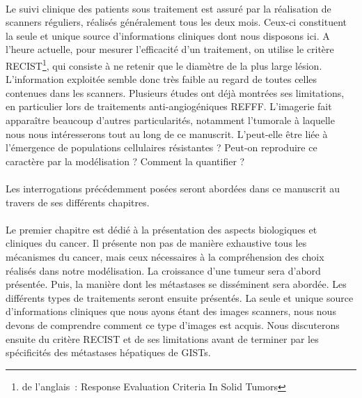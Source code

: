 \documentclass[main.tex]{subfiles}
\begin{document}
\paragraph{}
Le suivi clinique des patients sous traitement est assuré par la réalisation de scanners réguliers, réalisés généralement tous les deux mois. Ceux-ci constituent la seule et unique source d'informations cliniques dont nous disposons ici.  
A l'heure actuelle, pour mesurer l'efficacité d'un traitement, on %
utilise le critère RECIST\footnote{de l'anglais~: Response Evaluation Criteria In Solid Tumors}, qui consiste à ne retenir %
que le diamètre de la plus large lésion. 
L'information exploitée %
semble donc très faible au regard de toutes celles contenues dans les scanners. 
Plusieurs études ont déjà montrées ses limitations, en particulier lors de traitements anti-angiogéniques REFFF. L'imagerie fait apparaître beaucoup d'autres particularités, notamment l'\hetero tumorale à laquelle nous nous intéresserons tout au long de ce manuscrit. L'\hetero peut-elle être liée à l'émergence de populations cellulaires résistantes ? Peut-on reproduire ce caractère par la modélisation ? Comment la quantifier ?



\paragraph{}
Les interrogations précédemment posées seront abordées dans ce manuscrit au travers de ses différents chapitres. 

\paragraph{}
Le premier chapitre est dédié à la présentation des aspects biologiques et cliniques du cancer.  
Il présente non pas de manière exhaustive tous les mécanismes du cancer, mais ceux nécessaires à la compréhension des choix réalisés dans notre modélisation. 
La croissance d'une tumeur sera d'abord présentée. 
Puis, la manière dont les métastases se disséminent sera abordée. Les différents types de traitements seront ensuite présentés. La seule et unique source d'informations cliniques que nous ayons étant des images scanners, nous nous devons de comprendre comment ce type d'images est acquis. Nous discuterons ensuite du critère RECIST et de ses limitations avant de terminer par les spécificités des métastases hépatiques de GISTs.
\end{document}
